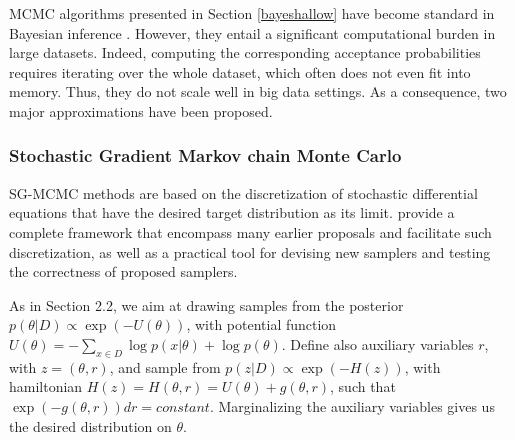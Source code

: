 MCMC algorithms presented in Section \ref{bayeshallow}
have become standard in Bayesian inference \cite{french}.
However, they entail a significant computational burden in large datasets. Indeed, 
computing the corresponding acceptance probabilities 
 requires iterating over the whole dataset, which often does not even
 fit into memory. Thus, they 
  do not scale well in big data settings. 
 As a consequence, two major approximations have been proposed.

\subsubsection{Stochastic Gradient Markov chain Monte Carlo}\label{bayesdeep} 

SG-MCMC methods are based on the discretization of 
stochastic differential equations that have the desired target 
distribution as its limit. \cite{ma2015complete} provide a
complete framework that encompass many earlier proposals and
facilitate such discretization, as well as a practical tool for
devising new samplers and testing the correctness of proposed samplers.

As in Section 2.2, we aim at drawing samples from the
posterior $p(\theta |D) \propto \exp(-U(\theta ))$,
with potential function
$U(\theta ) = -\sum _{x\in D} \log p(x|\theta ) + \log p(\theta )$. Define also auxiliary variables $r$,
with $z=( \theta, r )$, and sample from $p(z|D) \propto  \exp(-H(z))$, with hamiltonian
$H(z) = H(\theta , r) = U(\theta ) + g(\theta , r)$, such that
$\exp(-g(\theta , r))dr = constant$. 
Marginalizing the auxiliary variables gives us the desired distribution on $\theta $.

